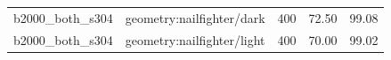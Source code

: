\begin{longtable}{l>{\raggedright\arraybackslash}p{.42\linewidth}rrr}
b2000\_\allowbreak{}both\_\allowbreak{}s304 & %
geometry:nailfighter/dark & %
400 & %
72.50 & %
99.08 \\ %

b2000\_\allowbreak{}both\_\allowbreak{}s304 & %
geometry:nailfighter/light & %
400 & %
70.00 & %
99.02 \\ %


\end{longtable}
